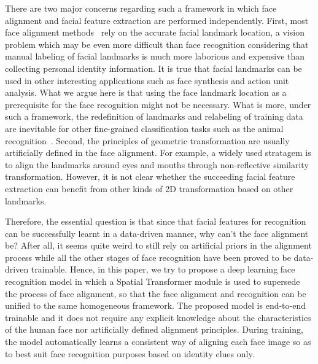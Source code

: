 \documentclass[10pt,twocolumn,letterpaper]{article}
\begin{document}
There are two major concerns regarding such a framework in which face alignment and facial feature extraction are performed independently. 
First, most face alignment methods~\cite{xiong2013supervised,ren2014face,chen2014joint,zhang2016joint} rely on the accurate facial landmark location, a vision problem which may be even more difficult than face recognition considering that manual labeling of facial landmarks is much more laborious and expensive than collecting personal identity information. 
It is true that facial landmarks can be used in other interesting applications such as face synthesis and action unit analysis. 
What we argue here is that using the face landmark location as a prerequisite for the face recognition might not be necessary. 
What is more, under such a framework, the redefinition of landmarks and relabeling of training data are inevitable for other fine-grained classification tasks such as the animal recognition~\cite{zhang2013deformable,zhang2014part}.
Second, the principles of geometric transformation are usually artificially defined in the face alignment. 
For example, a widely used stratagem is to align the landmarks around eyes and mouths through non-reflective similarity transformation. 
However, it is not clear whether the succeeding facial feature extraction can benefit from other kinds of 2D transformation based on other landmarks. 

Therefore, the essential question is that since that facial features for recognition can be successfully learnt in a data-driven manner, why can't the face alignment be? 
After all, it seems quite weird to still rely on artificial priors in the alignment process while all the other stages of face recognition have been proved to be data-driven trainable. 
Hence, in this paper, we try to propose a deep learning face recognition model in which a Spatial Transformer module \cite{jaderberg2015spatial} is used to supersede the process of face alignment, so that the face alignment and recognition can be unified to the same homogeneous framework. 
The proposed model is end-to-end trainable and it does not require any explicit knowledge about the characteristics of the human face nor artificially defined alignment principles.
During training, the model automatically learns a consistent way of aligning each face image so as to best suit face recognition purposes based on identity clues only. 
\end{document}
